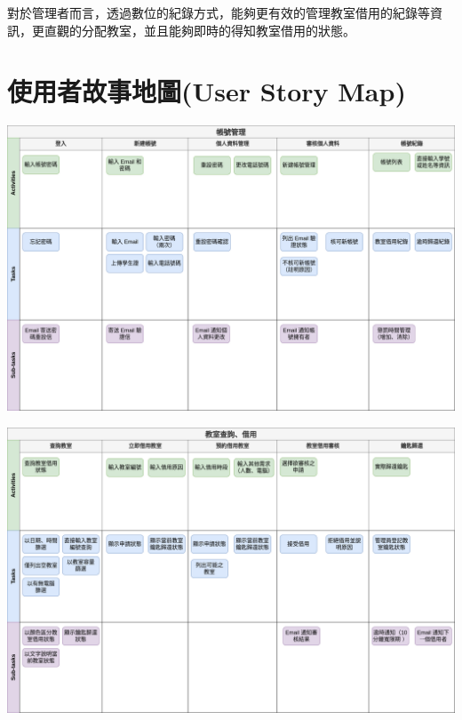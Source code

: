 \documentclass{article}
\begin{document}
對於管理者而言，透過數位的紀錄方式，能夠更有效的管理教室借用的紀錄等資訊，更直觀的分配教室，並且能夠即時的得知教室借用的狀態。

\newpage

\section[使用者故事地圖(USER STORY MAP)]{使用者故事地圖(User Story Map)}

\begin{center}
	\includegraphics[height=0.45\textheight]{UserStoryMap-AccountManagement.png}
\end{center}

\begin{center}
	\includegraphics[height=0.45\textheight]{UserStoryMap-ClassroomBorrowing.png}
\end{center}
\newpage
\end{document}
